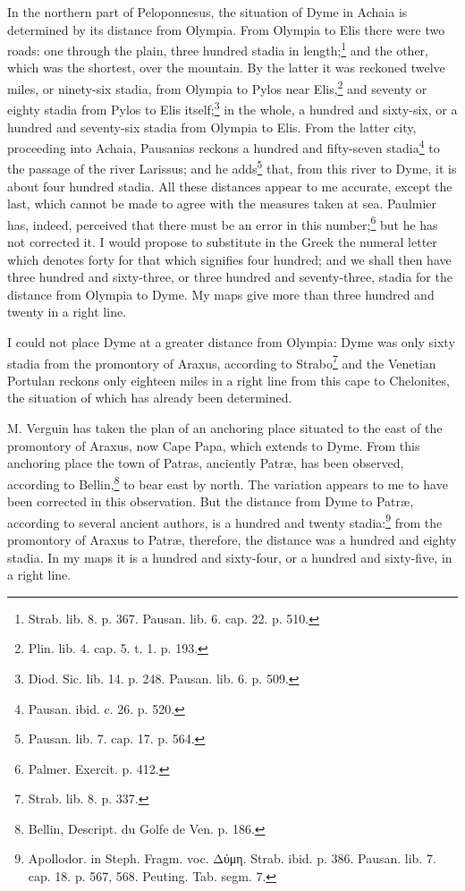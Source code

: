 \documentclass[a4paper, 11pt, oneside, polutonikogreek, english]{article}
\begin{document}
In the northern part of Peloponnesus, the situation of Dyme in Achaia is determined by its distance from Olympia. From Olympia to Elis there were two roads: one through the plain, three hundred stadia in length;\footnote{Strab. lib. 8. p. 367. Pausan. lib. 6. cap. 22. p. 510.} and the other, which was the shortest, over the mountain. By the latter it was reckoned twelve miles, or ninety-six stadia, from Olympia to Pylos near Elis,\footnote{Plin. lib. 4. cap. 5. t. 1. p. 193.} and seventy or eighty stadia from Pylos to Elis itself;\footnote{Diod. Sic. lib. 14. p. 248. Pausan. lib. 6. p. 509.} in the whole, a hundred and sixty-six, or a hundred and seventy-six stadia from Olympia to Elis. From the latter city, proceeding into Achaia, Pausanias reckons a hundred and fifty-seven stadia\footnote{Pausan. ibid. c. 26. p. 520.} to the passage of the river Larissus; and he adds\footnote{Pausan. lib. 7. cap. 17. p. 564.} that, from this river to Dyme, it is about four hundred stadia. All these distances appear to me accurate, except the last, which cannot be made to agree with the measures taken at sea. Paulmier has, indeed, perceived that there must be an error in this number;\footnote{Palmer. Exercit. p. 412.} but he has not corrected it. I would propose to substitute in the Greek the numeral letter which denotes forty for that which signifies four hundred; and we shall then have three hundred and sixty-three, or three hundred and seventy-three, stadia for the distance from Olympia to Dyme. My maps give more than three hundred and twenty in a right line.

I could not place Dyme at a greater distance from Olympia: Dyme was only sixty stadia from the promontory of Araxus, according to Strabo\footnote{Strab. lib. 8. p. 337.} and the Venetian Portulan reckons only eighteen miles in a right line from this cape to Chelonites, the situation of which has already been determined.

M. Verguin has taken the plan of an anchoring place situated to the east of the promontory of Araxus, now Cape Papa, which extends to Dyme. From this anchoring place the town of Patras, anciently Patræ, has been observed, according to Bellin,\footnote{Bellin, Descript. du Golfe de Ven. p. 186.} to bear east by north. The variation appears to me to have been corrected in this observation. But the distance from Dyme to Patræ, according to several ancient authors, is a hundred and twenty stadia:\footnote{Apollodor. in Steph. Fragm. voc. Δύμη. Strab. ibid. p. 386. Pausan. lib. 7. cap. 18. p. 567, 568. Peuting. Tab. segm. 7.} from the promontory of Araxus to Patræ, therefore, the distance was a hundred and eighty stadia. In my maps it is a hundred and sixty-four, or a hundred and sixty-five, in a right line.
\end{document}
